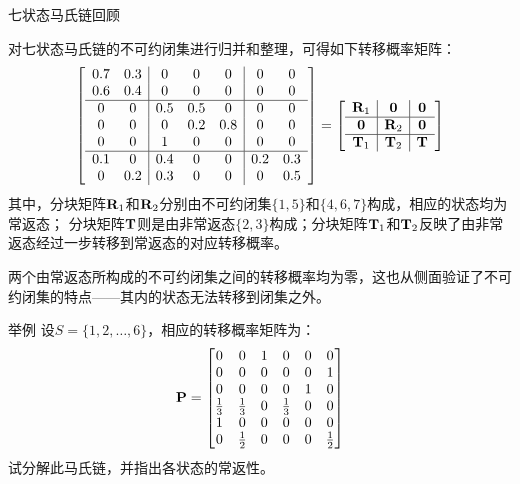 \documentclass[t]{beamer}
\begin{document}
\begin{frame}{七状态马氏链回顾}
    \begin{spacing}{1.2}
   \small 对七状态马氏链的不可约闭集进行归并和整理，可得如下转移概率矩阵：
    \[\left[\begin{array}{cc|ccc|cc}
        0.7&0.3&0&0&0&0&0\\
        0.6&0.4&0&0&0&0&0\\
        \hline
        0&0&0.5&0.5&0&0&0\\
        0&0&0&0.2&0.8&0&0\\
        0&0&1&0&0&0&0\\
    \hline
        0.1&0&0.4&0&0&0.2&0.3\\
        0&0.2&0.3&0&0&0&0.5\\
    \end{array}
        \right]=\left[\begin{array}{c|c|c}
            {\bf R}_1 & \bf{0} &\bf{0}\\
            \hline
            \bf{0} &{\bf R}_2 &\bf{0}\\
            \hline
            {\bf T}_1 & {\bf T}_2 & {\bf T}
        \end{array}
            \right]
    \]
    其中，分块矩阵${\bf R}_1$和${\bf R}_2$分别由不可约闭集$\{1,5\}$和$\{4,6,7\}$构成，相应的状态均为常返态； 
分块矩阵${\bf T}$则是由非常返态$\{2,3\}$构成；分块矩阵${\bf T}_1$和${\bf T}_2$反映了由非常返态经过一步转移到常返态的对应转移概率。

两个由常返态所构成的不可约闭集之间的转移概率均为零，这也从侧面验证了不可约闭集的特点——其内的状态无法转移到闭集之外。
    \end{spacing}
\end{frame}


\begin{frame}{举例}
    设$S=\{1,2,\ldots,6\}$，相应的转移概率矩阵为：
    \[{\bf P}=\begin{bmatrix}
    0 & 0 & 1 & 0 & 0 & 0\\
    0 & 0 & 0 & 0 & 0 & 1\\
    0 & 0 & 0 & 0 & 1 & 0\\
    \frac{1}{3} & \frac{1}{3} & 0 & \frac{1}{3} & 0 & 0\\
    1 & 0 & 0 & 0 & 0 & 0\\
    0 & \frac{1}{2} & 0 & 0 & 0 & \frac{1}{2}
    \end{bmatrix} \]
    试分解此马氏链，并指出各状态的常返性。
\end{frame}
\end{document}
